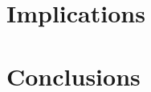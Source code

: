 \section{Implications}  \label{sec:ch1_implications}
    
    
\section{Conclusions}  \label{sec:ch1_conclusions}
    